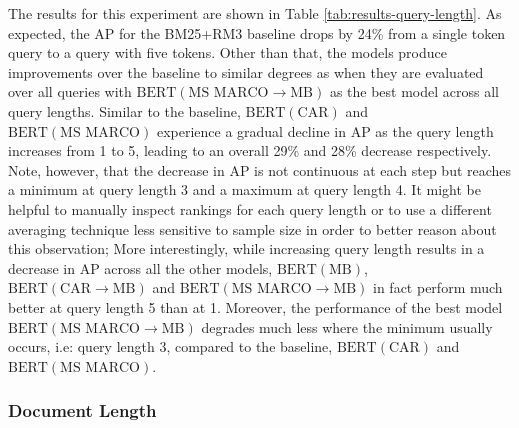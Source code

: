 The results for this experiment are shown in Table \ref{tab:results-query-length}.
As expected, the AP for the BM25+RM3 baseline drops by 24\% from a single token query to a query with five tokens.
Other than that, the models produce improvements over the baseline to similar degrees as when they are evaluated over all queries with $ \textrm{BERT}(\textrm{MS MARCO}\rightarrow\textrm{MB}) $ as the best model across all query lengths.
Similar to the baseline, $ \textrm{BERT}(\textrm{CAR}) $ and $ \textrm{BERT}(\textrm{MS MARCO}) $ experience a gradual decline in AP as the query length increases from 1 to 5, leading to an overall 29\% and 28\% decrease respectively.
Note, however, that the decrease in AP is not continuous at each step but reaches a minimum at query length 3 and a maximum at query length 4.
It might be helpful to manually inspect rankings for each query length or to use a different averaging technique less sensitive to sample size in order to better reason about this observation; 
More interestingly, while increasing query length results in a decrease in AP across all the other models, $ \textrm{BERT}(\textrm{MB}) $, $ \textrm{BERT}(\textrm{CAR}\rightarrow\textrm{MB}) $ and $ \textrm{BERT}(\textrm{MS MARCO}\rightarrow\textrm{MB}) $ in fact perform much better at query length 5 than at 1.
Moreover, the performance of the best model  $ \textrm{BERT}(\textrm{MS MARCO}\rightarrow\textrm{MB}) $ degrades much less where the minimum usually occurs, i.e: query length 3, compared to the baseline, $ \textrm{BERT}(\textrm{CAR}) $ and $ \textrm{BERT}(\textrm{MS MARCO}) $.

\subsubsection{Document Length}

\begin{table*}[t!]
\caption{Ranking effectiveness on chopped MS MARCO and CAR}
\label{tab:results-chopped}
\end{table*}

